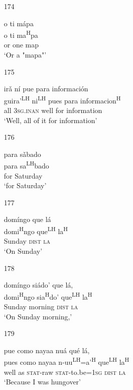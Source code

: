 \begin{itemize}
\item[174]
 
\glll   o ti m\'{a}pa \\
o ti ma\textsuperscript{H}pa \\
or one map \\
\glt `Or a "mapa"'
 


\item[175]
 
\glll   ir\v{a} n\'{i} pue para informaci\'{o}n  \\
guira'\textsuperscript{LH} ni\textsuperscript{LH} pues para informacion\textsuperscript{H}  \\
all \textsc{3sg.inan} well for information \\
\glt `Well, all of it for information'
 


\item[176]
 
\glll   para s\v{a}bado  \\
 para sa\textsuperscript{LH}bado \\
for Saturday \\
\glt `for Saturday'
 

\item[177]
 
\glll   dom\'{i}ngo que l\'{a} \\
 domi\textsuperscript{H}ngo que\textsuperscript{LH} la\textsuperscript{H} \\
Sunday \textsc{dist} \textsc{la} \\
\glt `On Sunday'
 

\item[178]
 
\glll   dom\'{i}ngo si\'{a}do' que l\'{a},  \\
 domi\textsuperscript{H}ngo sia\textsuperscript{H}do' que\textsuperscript{LH} la\textsuperscript{H} \\
Sunday morning \textsc{dist} \textsc{la} \\
\glt `On Sunday morning,'
 


\item[179]
 
\glll   pue como nayaa nu\'{a} qu\'{e} l\'{a}, \\
pues como nayaa n-uu\textsuperscript{LH}=a'\textsuperscript{H} que\textsuperscript{LH} la\textsuperscript{H} \\
well as \textsc{stat}-raw \textsc{stat}-to.be=\textsc{1sg} \textsc{dist} \textsc{la} \\
\glt `Because I was hungover'
 



\end{itemize}

